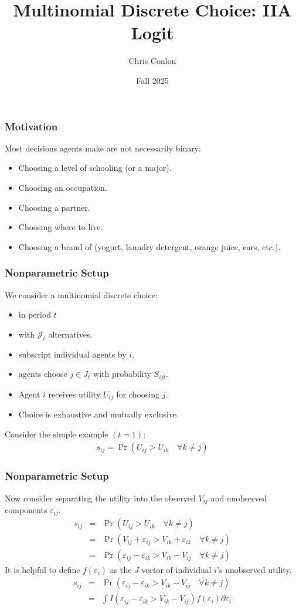 

\title{Multinomial Discrete Choice: IIA Logit}
\author{Chris Conlon}
\date{Fall 2025}

\frame{\titlepage}


\begin{frame}
\frametitle{Motivation}
Most decisions agents make are not necessarily binary:
\begin{itemize}
\item Choosing a level of schooling (or a major).
\item Choosing an occupation.
\item Choosing a partner.
\item Choosing where to live.
\item Choosing a brand of (yogurt, laundry detergent, orange juice, cars, etc.).
 \end{itemize}
\end{frame}

\begin{frame}
\frametitle{Nonparametric Setup}
We consider a \alert{multinomial discrete choice}:
\begin{itemize}
\item in period $t$
\item with $\mathcal{J}_t$ alternatives.
\item subscript individual agents by $i$.
\item agents choose $j \in J_t$ with probability $S_{ijt}$.
\item Agent $i$ receives utility $U_{ij}$ for choosing $j$.
\item Choice is exhaustive and mutually exclusive.
 \end{itemize}\pause
Consider the simple example $(t=1)$:
\begin{eqnarray*}
s_{ij} = \Pr( U_{ij} > U_{ik} \quad \forall k \neq j)
\end{eqnarray*}
\end{frame}

\begin{frame}
\frametitle{Nonparametric Setup}
Now consider separating the utility into the \alert{observed} $V_{ij}$ and \alert{unobserved} components $\varepsilon_{ij}$.
\begin{eqnarray*}
s_{ij} &=& \Pr( U_{ij} > U_{ik} \quad \forall k \neq j)\\
 &=& \Pr( V_{ij} + \varepsilon_{ij} > V_{ik} + \varepsilon_{ik} \quad \forall k \neq j)\\
 &=& \Pr( \varepsilon_{ij}-\varepsilon_{ik} > V_{ik} - V_{ij} \quad \forall k \neq j)
\end{eqnarray*}
\pause
It is helpful to define $f(\varepsilon_{i})$ as the $J$ vector of individual $i$'s unobserved utility.
\begin{eqnarray*}
s_{ij} &=& \Pr( \varepsilon_{ij}-\varepsilon_{ik} > V_{ik} - V_{ij} \quad \forall k \neq j)\\
&=& \int I( \varepsilon_{ij}-\varepsilon_{ik} > V_{ik} - V_{ij} ) f( \varepsilon_i) \partial \varepsilon_i \\
\end{eqnarray*}
\end{frame}

